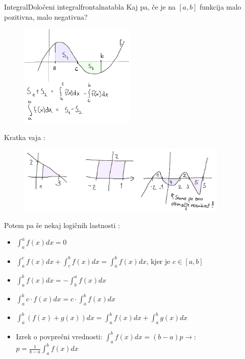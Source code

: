 \begin{priprava}{}{}{Integral}{Določeni integral}{frontalna}{tabla}
Kaj pa, če je na $ [a, b] $ funkcija malo pozitivna, malo negativna?

\begin{figure}[h]
    \centering
    \includegraphics[width=0.5\textwidth]{slike/ploscine2.png}
\end{figure}

\newpage

Kratka vaja :

\begin{figure}[h]
    \centering
    \includegraphics[width=0.9\textwidth]{slike/dol_vaje1.png}
\end{figure}

Potem pa še nekaj logičnih lastnosti :


\begin{itemize}
    \item $ \int_a^a f(x) dx = 0 $
    \item $ \int_a^c f(x) dx + \int_c^b f(x) dx = \int_a^b f(x) dx $, kjer je $ c \in [a, b] $
    \item $ \int_a^b f(x) dx = - \int_b^a f(x) dx $ 
    \item $ \int_a^b c \cdot f(x) dx = c \cdot \int_a^b f(x) dx $
    \item $\int_a^b (f(x) + g(x)) dx = \int_a^b f(x) dx + \int_a^b g(x) dx $
    \item Izrek o povprečni vrednosti: $ \int_a^b f(x) dx = (b-a)p \rightarrow $: $ p = \frac{1}{b - a} \int_a^b f(x) dx $
    

\end{itemize}
\end{priprava}
